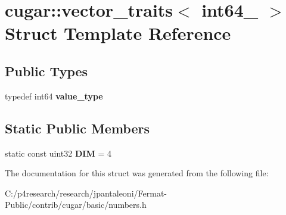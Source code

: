 \hypertarget{structcugar_1_1vector__traits_3_01int64__4_01_4}{}\section{cugar\+:\+:vector\+\_\+traits$<$ int64\+\_ $>$ Struct Template Reference}
\label{structcugar_1_1vector__traits_3_01int64__4_01_4}
\subsection*{Public Types}
\begin{DoxyCompactItemize}
\item 
\mbox{\label{structcugar_1_1vector__traits_3_01int64__4_01_4_a0c65c3a2a5ee07f972e60d21ba59c4a6}} 
typedef int64 {\bfseries value\+\_\+type}
\end{DoxyCompactItemize}
\subsection*{Static Public Members}
\begin{DoxyCompactItemize}
\item 
\mbox{\label{structcugar_1_1vector__traits_3_01int64__4_01_4_ab7923e7531ec57d51185b72171204aa8}} 
static const uint32 {\bfseries D\+IM} = 4
\end{DoxyCompactItemize}


The documentation for this struct was generated from the following file\+:\begin{DoxyCompactItemize}
\item 
C\+:/p4research/research/jpantaleoni/\+Fermat-\/\+Public/contrib/cugar/basic/numbers.\+h\end{DoxyCompactItemize}

